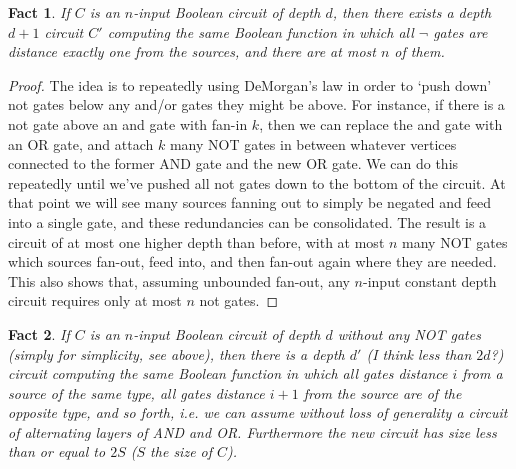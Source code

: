 \documentclass{article}
\theoremstyle{definition}
\theoremstyle{plain}
\theoremstyle{theorem}
\newtheorem{fact}{Fact}[section]
\begin{document}
\begin{fact}
	If $C$ is an $n$-input Boolean circuit of depth $d$, then there exists a depth $d+1$ circuit $C'$ computing the same Boolean function in which all $\neg$ gates are distance exactly one from the sources, and there are at most $n$ of them.
\end{fact}
\begin{proof}
	The idea is to repeatedly using DeMorgan's law in order to `push down' not gates below any and/or gates they might be above. For instance, if there is a not gate above an and gate with fan-in $k$, then we can replace the and gate with an OR gate, and attach $k$ many NOT gates in between whatever vertices connected to the former AND gate and the new OR gate. We can do this repeatedly until we've pushed all not gates down to the bottom of the circuit. At that point we will see many sources fanning out to simply be negated and feed into a single gate, and these redundancies can be consolidated. The result is a circuit of at most one higher depth than before, with at most $n$ many NOT gates which sources fan-out, feed into, and then fan-out again where they are needed. This also shows that, assuming unbounded fan-out, any $n$-input constant depth circuit requires only at most $n$ not gates. 
\end{proof}
\begin{fact}
	If $C$ is an $n$-input Boolean circuit of depth $d$ without any NOT gates (simply for simplicity, see above), then there is a depth $d'$ (I think less than $2d$?) circuit computing the same Boolean function in which all gates distance $i$ from a source of the same type, all gates distance $i+1$ from the source are of the opposite type, and so forth, i.e. we can assume without loss of generality a circuit of alternating layers of AND and OR. Furthermore the new circuit has size less than or equal to $2S$ ($S$ the size of $C$).
\end{fact}
\end{document}
